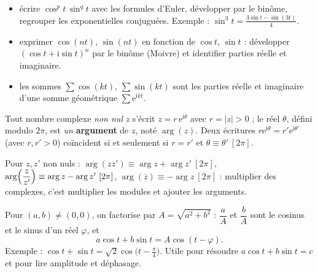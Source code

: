 \begin{savoirfaire}
\begin{itemize}[label={\color{otGreenDark}\textbullet},leftmargin=1.4em,itemsep=0.6mm,topsep=0.5mm]
  \item {} écrire $\cos^{p}t\,\sin^{q}t$ avec les formules
    d'Euler, développer par le binôme, regrouper les exponentielles
    conjuguées. Exemple : $\sin^{3}t=\frac{3\sin t-\sin(3t)}{4}$.
  \item {} exprimer $\cos(nt)$, $\sin(nt)$ en fonction de
    $\cos t$, $\sin t$ : développer $(\cos t+\mathrm{i}\sin t)^{n}$ par le
    binôme (Moivre) et identifier parties réelle et imaginaire.
  \item {} les sommes $\sum\cos(kt)$, $\sum\sin(kt)$ sont les
    parties réelle et imaginaire d'une somme géométrique $\sum\mathrm{e}^{\mathrm{i}kt}$.
\end{itemize}
\end{savoirfaire}


\begin{definition}
Tout nombre complexe \emph{non nul} $z$ s'écrit
$z=r\,\mathrm{e}^{\mathrm{i}\theta}$ avec $r=|z|>0$ ; le réel $\theta$,
défini modulo $2\pi$, est \emph{un} \textbf{argument} de $z$, noté
$\arg(z)$. Deux écritures $r\mathrm{e}^{\mathrm{i}\theta}=r'\mathrm{e}^{\mathrm{i}\theta'}$
(avec $r,r'>0$) coïncident si et seulement si $r=r'$ et
$\theta\equiv\theta'\ [2\pi]$.
\end{definition}

\begin{propriete}
Pour $z,z'$ non nuls :
$\arg(zz')\equiv\arg z+\arg z'\ [2\pi]$,\quad
$\arg\Bigl(\dfrac{z}{z'}\Bigr)\equiv\arg z-\arg z'\ [2\pi]$,\quad
$\arg(\overline{z})\equiv-\arg z\ [2\pi]$ :
multiplier des complexes, c'est multiplier les modules et ajouter les arguments.
\end{propriete}

\begin{savoirfaire}
Pour $(a,b)\neq(0,0)$, on factorise par $A=\sqrt{a^{2}+b^{2}}$ :
$\dfrac{a}{A}$ et $\dfrac{b}{A}$ sont le cosinus et le sinus d'un réel
$\varphi$, et
\[
  a\cos t+b\sin t=A\cos(t-\varphi).
\]
Exemple : $\cos t+\sin t=\sqrt2\cos\bigl(t-\frac{\pi}{4}\bigr)$. Utile pour
résoudre $a\cos t+b\sin t=c$ et pour lire amplitude et déphasage.
\end{savoirfaire}

